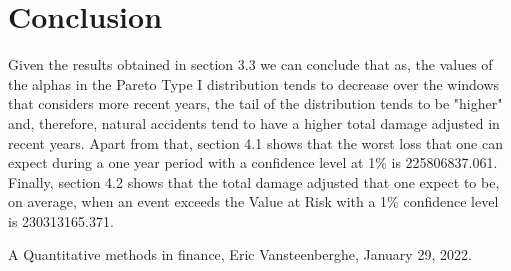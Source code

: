 \documentclass[paper=a4, fontsize=11pt]{scrartcl} %
\begin{document}
\section{Conclusion}
Given the results obtained in section 3.3 we can conclude that as, the values of the alphas in the Pareto Type I distribution tends to decrease over the windows that considers more recent years, the tail of the distribution tends to be "higher" and, therefore, natural accidents tend to have a higher total damage adjusted in recent years. Apart from that, section 4.1 shows that the worst loss that one can expect during a one year period with a confidence level at 1\% is 225806837.061. Finally, section 4.2 shows that the total damage adjusted that one expect to be, on average, when an event exceeds the Value at Risk with a 1\% confidence level is 230313165.371.


\newpage
\begin{thebibliography}{9}
    \bibitem A Quantitative methods in finance, Eric Vansteenberghe, January 29, 2022.
\end{thebibliography}
\end{document}
